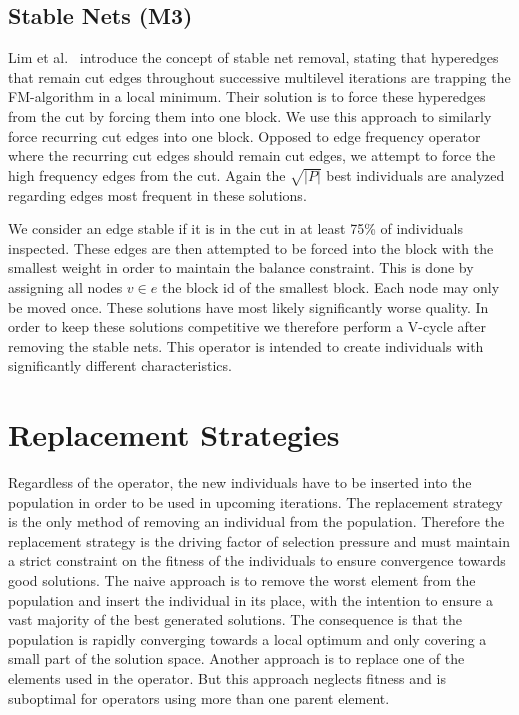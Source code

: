 \documentclass[a4paper,12pt,titlepage, BCOR7mm,headsepline]{scrbook}
\numberwithin{equation}{section}
\begin{document}
\subsection{Stable Nets (M3)}
Lim et al.~\cite{lim1997large} introduce the concept of stable net removal, stating that hyperedges that remain cut edges throughout successive multilevel iterations are trapping the FM-algorithm in a local minimum. Their solution is to force these hyperedges from the cut by forcing them into one block. 
We use this approach to similarly force recurring cut edges into one block. 
Opposed to edge frequency operator where the recurring cut edges should remain cut edges, we attempt to force the high frequency edges from the cut.
Again the $\sqrt{|P|}$ best individuals are analyzed regarding edges most frequent in these solutions. 

We consider an edge stable if it is in the cut in at least 75\% of individuals inspected.
These edges are then attempted to be forced into the block with the smallest weight in order to maintain the balance constraint. This is done by assigning all nodes $ v \in e$ the block id of the smallest block.
Each node may only be moved once.
These solutions have most likely significantly worse quality.%
In order to keep these solutions competitive we therefore perform a V-cycle after removing the stable nets. This operator is intended to create individuals with significantly different characteristics. 
\section{Replacement Strategies}
\label{sec:replacement}
Regardless of the operator, the new individuals have to be inserted into the population in order to be used in upcoming iterations. The replacement strategy is the only method of removing an individual from the population.
Therefore the replacement strategy is the driving factor of selection pressure and must maintain a strict constraint on the fitness of the individuals to ensure convergence towards good solutions. 
The naive approach is to remove the worst element from the population and insert the individual in its place, with the intention to ensure a vast majority of the best generated solutions.
The consequence is that the population is rapidly converging towards a local optimum and only covering a small part of the solution space. Another approach is to replace one of the elements used in the operator.%
But this approach neglects fitness and is suboptimal for operators using more than one parent element. 
\end{document}
